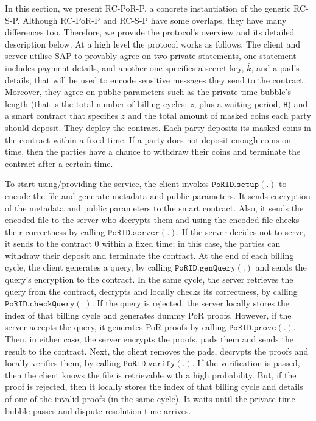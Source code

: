 In this section, we present RC-PoR-P,  a concrete instantiation of the generic RC-S-P.  Although RC-PoR-P and RC-S-P have some overlaps, they have many differences too. Therefore, we provide the protocol’s overview and its detailed description below.
At a high level the protocol works as follows. The client and server utilise SAP to provably agree on two private statements, one statement includes payment details, and another one specifies a secret key, $\bar{k}$, and a pad's details, that will be used to encode sensitive messages they send to the contract. Moreover, they  agree on public parameters such as the private time bubble's length (that is the total number of billing cycles: $z$, plus a waiting period, $\texttt{H}$) and a smart contract that specifies $z$ and the total amount of masked coins each party should deposit. They deploy the contract. Each party deposits its masked coins in the contract within a fixed time. If a party does not deposit enough coins on time, then the parties have a chance to withdraw their coins and terminate the contract after a certain time. 

To start using/providing the service, the client invokes $\mathtt{PoRID.setup}(.)$ to encode the file and generate  metadata and public parameters. It sends  encryption of the metadata and public parameters to the smart contract. Also, it  sends the encoded file to the server who decrypts them and using the encoded file checks their correctness by calling $\mathtt{PoRID.server}(.)$. If the server decides not to serve, it sends to the contract $0$ within a fixed time; in this case, the parties can withdraw their deposit and terminate the contract.  At the end of each billing cycle, the client generates a query, by calling $\mathtt{PoRID.genQuery(.)}$ and sends the query's encryption to the contract. In the same cycle, the server retrieves the query from the contract, decrypts and locally checks its correctness, by calling $\mathtt{PoRID.checkQuery(.)}$. If the query is rejected, the server locally stores the index of that billing cycle and generates  dummy PoR proofs. However, if the server accepts the query, it generates PoR proofs by calling $\mathtt{PoRID.prove(.)}$. Then, in either case, the server encrypts the proofs, pads them and sends the result to the contract. Next, the client removes the pads, decrypts the proofs and locally verifies them, by calling $\mathtt{PoRID.verify(.)}$. If the verification is passed, then the client knows the file is retrievable with a high probability. But, if the proof is rejected, then it locally stores the index of that billing cycle and details of one of the invalid proofs (in the same cycle). It  waits until the private time bubble passes and dispute resolution time arrives. 

